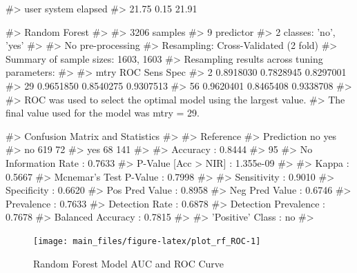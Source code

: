 \begin{Schunk}
\begin{Soutput}
#>    user  system elapsed 
#>   21.75    0.15   21.91
\end{Soutput}
\begin{Soutput}
#> Random Forest 
#> 
#> 3206 samples
#>    9 predictor
#>    2 classes: 'no', 'yes' 
#> 
#> No pre-processing
#> Resampling: Cross-Validated (2 fold) 
#> Summary of sample sizes: 1603, 1603 
#> Resampling results across tuning parameters:
#> 
#>   mtry  ROC        Sens       Spec     
#>    2    0.8918030  0.7828945  0.8297001
#>   29    0.9651850  0.8540275  0.9307513
#>   56    0.9620401  0.8465408  0.9338708
#> 
#> ROC was used to select the optimal model using the largest value.
#> The final value used for the model was mtry = 29.
\end{Soutput}
\end{Schunk}

\begin{Schunk}
\begin{Soutput}
#> Confusion Matrix and Statistics
#> 
#>           Reference
#> Prediction  no yes
#>        no  619  72
#>        yes  68 141
#>                                           
#>                Accuracy : 0.8444          
#>                  95%
#>     No Information Rate : 0.7633          
#>     P-Value [Acc > NIR] : 1.355e-09       
#>                                           
#>                   Kappa : 0.5667          
#>  Mcnemar's Test P-Value : 0.7998          
#>                                           
#>             Sensitivity : 0.9010          
#>             Specificity : 0.6620          
#>          Pos Pred Value : 0.8958          
#>          Neg Pred Value : 0.6746          
#>              Prevalence : 0.7633          
#>          Detection Rate : 0.6878          
#>    Detection Prevalence : 0.7678          
#>       Balanced Accuracy : 0.7815          
#>                                           
#>        'Positive' Class : no              
#> 
\end{Soutput}
\end{Schunk}

\begin{Schunk}
\begin{figure}[H]

{\centering \texttt{[image: main\_files/figure-latex/plot\_rf\_ROC-1]} 

}

\caption[Random Forest Model AUC and ROC Curve]{Random Forest Model AUC and ROC Curve}\label{fig:plot_rf_ROC}
\end{figure}
\end{Schunk}

